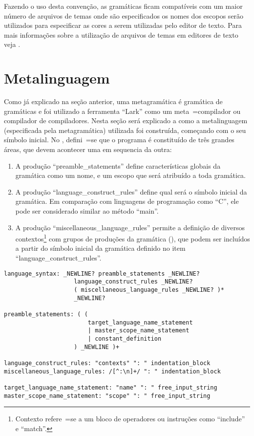 Fazendo o uso desta convenção,
as gramáticas ficam compatíveis com um maior número de arquivos de temas onde são especificados os nomes dos escopos serão utilizados para especificar as cores a serem utilizadas pelo editor de texto.
Para mais informações sobre a utilização de arquivos de temas em editores de texto veja .


\section{Metalinguagem}
\label{metalinguagemGrammar}

Como já explicado na seção anterior,
uma metagramática é gramática de gramáticas e
foi utilizado a ferramenta ``Lark'' \cite{larkContextualLexer} como um meta~=compilador ou
compilador de compiladores.
Nesta seção será explicado a como a metalinguagem (especificada pela metagramática) utilizada foi construída,
começando com o seu símbolo inicial.
No ,
defini~=se que o programa é constituído de três grandes áreas,
que devem acontecer uma em sequencia da outra:
\begin{enumerate}
\item A produção ``preamble\_statements'' define características globais da gramática como um nome,
e um escopo que será atribuído a toda gramática.
\item A produção ``language\_construct\_rules'' define qual será o símbolo inicial da gramática.
Em comparação com linguagens de programação como ``C'',
ele pode ser considerado similar ao método ``main''.
\item A produção ``miscellaneous\_language\_rules'' permite a definição de diversos contextos\footnote{
Contexto refere~=se a um bloco de operadores ou
instruções como ``include'' e
``match''.
} com grupos de produções da gramática (),
que podem ser incluídos a partir do símbolo inicial da gramática definido no item ``language\_construct\_rules''.
\end{enumerate}%
\begin{lstlisting}[caption={Simbolo Inicial da Metagramática ``ObjectBeauty''},label={simboloInicialDaMetagramatica},style=yaml_style]
language_syntax: _NEWLINE? preamble_statements _NEWLINE?
                    language_construct_rules _NEWLINE?
                    ( miscellaneous_language_rules _NEWLINE? )*
                    _NEWLINE?

preamble_statements: ( (
                        target_language_name_statement
                        | master_scope_name_statement
                        | constant_definition
                    ) _NEWLINE )+

language_construct_rules: "contexts" ": " indentation_block
miscellaneous_language_rules: /[^:\n]+/ ": " indentation_block

target_language_name_statement: "name" ": " free_input_string
master_scope_name_statement: "scope" ": " free_input_string
\end{lstlisting}


